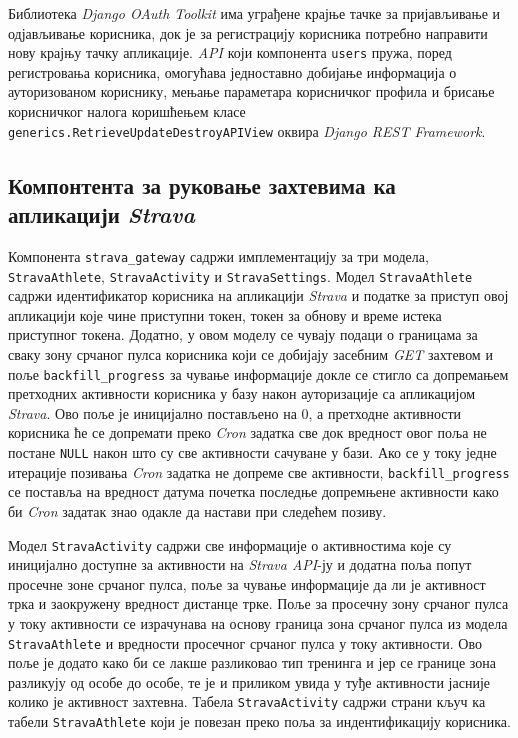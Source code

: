 \documentclass[12pt,oneside]{memoir}
\begin{document}
Библиотека \textit{Django OAuth Toolkit} има уграђене крајње тачке за пријављивање и одјављивање корисника, док је за регистрацију корисника потребно направити нову крајњу тачку апликације. \textit{API} који компонента \texttt{users} пружа, поред регистровања корисника, омогућава једноставно добијање информација о ауторизованом кориснику, мењање параметара корисничког профила и брисање корисничког налога коришћењем класе \texttt{generics.RetrieveUpdateDestroyAPIView} оквира \textit{Django REST Framework}.


\subsection{Компонтента за руковање захтевима ка апликацији \textit{Strava}}

Компонента \texttt{strava\_gateway} садржи имплементацију за три модела, \\ \texttt{StravaAthlete}, \texttt{StravaActivity} и \texttt{StravaSettings}. Модел \texttt{StravaAthlete} садржи идентификатор корисника на апликацији \textit{Strava} и податке за приступ овој апликацији које чине приступни токен, токен за обнову и време истека приступног токена. Додатно, у овом моделу се чувају подаци о границама за сваку зону срчаног пулса корисника који се добијају засебним \textit{GET} захтевом и поље \texttt{backfill\_progress} за чување информације докле се стигло са допремањем претходних активности корисника у базу након ауторизације са апликацијом \textit{Strava}. Ово поље је иницијално постављено на 0, а претходне активности корисника ће се допремати преко \textit{Cron} задатка све док вредност овог поља не постане \texttt{NULL} након што су све активности сачуване у бази. Ако се у току једне итерације позивања \textit{Cron} задатка не допреме све активности, \texttt{backfill\_progress} се поставља на вредност датума почетка последње допремњене активности како би \textit{Cron} задатак знао одакле да настави при следећем позиву.

Модел \texttt{StravaActivity} садржи све информације о активностима које су иницијално доступне за активности на \textit{Strava API}-ју и додатна поља попут просечне зоне срчаног пулса, поље за чување информације да ли је активност трка и заокружену вредност дистанце трке. Поље за просечну зону срчаног пулса у току активности се израчунава на основу граница зона срчаног пулса из модела \texttt{StravaAthlete} и вредности просечног срчаног пулса у току активности. Ово поље је додато како би се лакше разликовао тип тренинга и јер се границе зона разликују од особе до особе, те је и приликом увида у туђе активности јасније колико је активност захтевна. Табела \texttt{StravaActivity} садржи страни кључ ка табели \texttt{StravaAthlete} који је повезан преко поља за индентификацију корисника.
\end{document}
